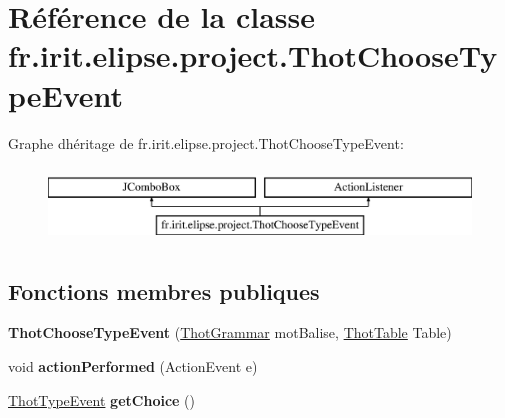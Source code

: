 \hypertarget{classfr_1_1irit_1_1elipse_1_1project_1_1_thot_choose_type_event}{}\section{Référence de la classe fr.\+irit.\+elipse.\+project.\+Thot\+Choose\+Type\+Event}
\label{classfr_1_1irit_1_1elipse_1_1project_1_1_thot_choose_type_event}
Graphe d\textquotesingle{}héritage de fr.\+irit.\+elipse.\+project.\+Thot\+Choose\+Type\+Event\+:\begin{figure}[H]
\begin{center}
\leavevmode
\includegraphics[height=2.000000cm]{classfr_1_1irit_1_1elipse_1_1project_1_1_thot_choose_type_event}
\end{center}
\end{figure}
\subsection*{Fonctions membres publiques}
\begin{DoxyCompactItemize}
\item 
\mbox{\label{classfr_1_1irit_1_1elipse_1_1project_1_1_thot_choose_type_event_a49a24f688c59ac378e4e4b846ed3fa1f}} 
{\bfseries Thot\+Choose\+Type\+Event} (\mbox{\hyperlink{classfr_1_1irit_1_1elipse_1_1project_1_1_thot_grammar}{Thot\+Grammar}} mot\+Balise, \mbox{\hyperlink{classfr_1_1irit_1_1elipse_1_1project_1_1_thot_table}{Thot\+Table}} Table)
\item 
\mbox{\label{classfr_1_1irit_1_1elipse_1_1project_1_1_thot_choose_type_event_abd5648c0f1b562197b2622f93774a08e}} 
void {\bfseries action\+Performed} (Action\+Event e)
\item 
\mbox{\label{classfr_1_1irit_1_1elipse_1_1project_1_1_thot_choose_type_event_af266ec1515b4cb2ec6f3209807634dbd}} 
\mbox{\hyperlink{enumfr_1_1irit_1_1elipse_1_1project_1_1_thot_type_event}{Thot\+Type\+Event}} {\bfseries get\+Choice} ()
\end{DoxyCompactItemize}
